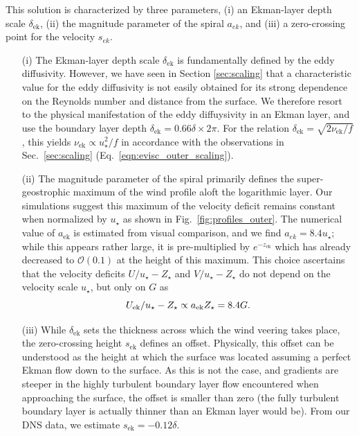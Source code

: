 \documentclass[a4paper,11pt]{amsart}
\begin{document}
%
This solution is characterized by three parameters,
(i) an Ekman-layer depth scale $\delta_\mathrm{ek}$,
(ii) the magnitude parameter of the spiral $a_{ek}$, and
(iii) a zero-crossing point for the velocity $s_{ek}$.
\begin{enumerate} 
%
\item[(i)] The Ekman-layer depth scale $\delta_\mathrm{ek}$ is fundamentally defined by the eddy diffusivity.
  However, we have seen in Section \ref{sec:scaling} that a characteristic value for the eddy diffusivity
  is not easily obtained for its strong dependence on the Reynolds number and distance from the surface.
  We therefore resort to the physical manifestation of the eddy diffuysivity in an Ekman layer, and use the
  boundary layer depth $\delta_\mathrm{ek} = 0.66 \delta \times 2\pi$.
  For the relation $\delta_\mathrm{ek}=\sqrt{2\nu_\mathrm{ek}/f}$, this yields
  $\nu_\mathrm{ek} \propto u_\star^2/f$ in accordance with the observations in
  Sec.~\ref{sec:scaling} (Eq.~\ref{eqn:evisc_outer_scaling}). 
\item[(ii)] The magnitude parameter of the spiral primarily defines the super-geostrophic maximum of the
  wind profile aloft the logarithmic layer. Our simulations suggest this maximum of the velocity deficit
  remains constant when normalized by $u_\star$ as shown in Fig.~\ref{fig:profiles_outer}.
  The numerical value of $a_\mathrm{ek}$ is estimated from visual comparison, and we find $a_{ek}=8.4u_\star$;
  while this appears rather large, it is pre-multiplied by $e^{-z_\mathrm{ek}}$ which has already decreased
  to $\mathcal{O}(0.1)$ at the height of this maximum.
  This choice ascertains that the velocity deficits $U/u_\star-Z_\star$ and $V/u_\star-Z_\star$ do not
  depend on the velocity scale $u_\star$, but only on $G$ as
  \begin{equation}
    U_\mathrm{ek}/u_\star-Z_\star \propto a_\mathrm{ek} Z_\star = 8.4G.  \notag
  \end{equation} 
\item[(iii)] While $\delta_\mathrm{ek}$ sets the thickness across which the wind veering takes place,
  the zero-crossing height $s_\mathrm{ek}$ defines an offset.
  Physically, this offset can be understood as the height at which the surface was located assuming
  a perfect Ekman flow down to the surface.
  As this is not the case, and gradients are steeper in the highly turbulent boundary layer flow encountered
  when approaching the surface, the offset is smaller than zero (the fully turbulent boundary layer is
  actually thinner than an Ekman layer would be).
  From our DNS data, we estimate $s_\mathrm{ek}=-0.12\delta$. 
\end{enumerate} 
\end{document}
